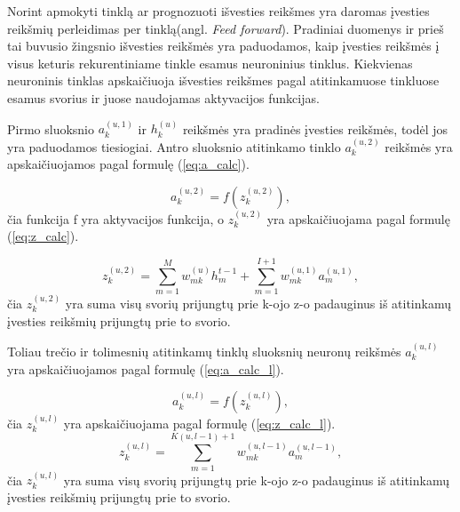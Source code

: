 Norint apmokyti tinklą ar prognozuoti išvesties reikšmes yra daromas įvesties reikšmių perleidimas per tinklą(angl. \textit{Feed forward}). Pradiniai duomenys ir prieš tai buvusio žingsnio išvesties reikšmės yra paduodamos, kaip įvesties reikšmės į visus keturis rekurentiniame tinkle esamus neuroninius tinklus. Kiekvienas neuroninis tinklas apskaičiuoja išvesties reikšmes pagal atitinkamuose tinkluose esamus svorius ir juose naudojamas aktyvacijos funkcijas.

Pirmo sluoksnio \begin{math}a_k^{(u,1)}\end{math} ir \begin{math}h_k^{(u)}\end{math} reikšmės yra pradinės įvesties reikšmės, todėl jos yra paduodamos tiesiogiai.
Antro sluoksnio atitinkamo tinklo \begin{math}a_k^{(u,2)}\end{math} reikšmės yra apskaičiuojamos pagal formulę (\ref{eq:a_calc}).

\begin{equation}\label{eq:a_calc}
  a_k^{(u,2)} = f(z_k^{(u,2)}),
\end{equation}
čia funkcija f yra aktyvacijos funkcija, o \begin{math}z_k^{(u,2)}\end{math} yra apskaičiuojama pagal formulę (\ref{eq:z_calc}).

\begin{equation}\label{eq:z_calc}
  z_k^{(u,2)} = \sum_{m=1}^{M} w_{mk}^{(u)}h_m^{t-1} + \sum_{m=1}^{I+1} w_{mk}^{(u,1)}a_m^{(u,1)},
\end{equation}
čia \begin{math}z_k^{(u,2)}\end{math} yra suma visų svorių prijungtų prie k-ojo z-o padauginus iš atitinkamų įvesties reikšmių prijungtų prie to svorio.

Toliau trečio ir tolimesnių atitinkamų tinklų sluoksnių neuronų reikšmės \begin{math}a_k^{(u,l)}\end{math} yra apskaičiuojamos pagal formulę (\ref{eq:a_calc_l}).

\begin{equation}\label{eq:a_calc_l}
  a_k^{(u,l)} = f(z_k^{(u,l)}),
\end{equation}
čia \begin{math}z_k^{(u,l)}\end{math} yra apskaičiuojama pagal formulę (\ref{eq:z_calc_l}).
\begin{equation}\label{eq:z_calc_l}
  z_k^{(u,l)} = \sum_{m=1}^{K(u,l-1)+1} w_{mk}^{(u,l-1)}a_m^{(u,l-1)},
\end{equation}
čia \begin{math}z_k^{(u,l)}\end{math} yra suma visų svorių prijungtų prie k-ojo z-o padauginus iš atitinkamų įvesties reikšmių prijungtų prie to svorio.


